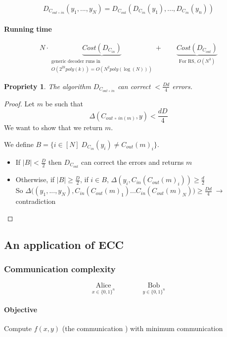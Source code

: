 \documentclass{article}
\newtheorem{prop}{Propriety}
\begin{document}
\[D_{C_{out\,\circ\, in}}(y_1,...,y_N)=D_{C_{out}}(D_{C_{in}}(y_1),...,D_{C_{in}}(y_n))\]


\paragraph{Running time}
\[N\cdot \underbrace{Cost(D_{C_{in}})}_{\substack{\text{generic decoder runs in}\\ O(2^{2k}poly(k))=O(N^2poly(\log(N)))}} + \qquad \underbrace{Cost(D_{C_{out}})}_{\text{For RS, } O(N^3)} \]

\begin{prop}
The algorithm $D_{C_{out \,\circ\, in}}$ can correct $<\frac{Dd}{4}$ errors.
\end{prop}
\begin{proof}
Let $m$ be such that 
\[\Delta( C_{out \,\circ \, in (m)},y) < \frac{dD}{4}\]
We want to show that we return $m$.

We define $B=\{i\in [N] \; D_{C_{in}}(y_i) \neq C_{out}(m)_i\}$.

\begin{itemize}
\item If $|B|<\frac{D}{2}$ then $D_{C_{out}}$ can correct the errors and returns $m$
\item Otherwise, if $|B|\geq \frac{D}{2}$, if $i\in B$, $\Delta(y_i,C_{in}(C_{out}(m)_i))\geq \frac{d}{2}$\\
So $\Delta \Big( (y_1,...,y_N),C_{in}(C_{out}(m)_1)...C_{in}(C_{out}(m)_N) \Big) \geq \frac{Dd}{4} \; \to \; $ contradiction
\end{itemize}
\end{proof}


\subsection{An application of ECC}

\subsubsection*{Communication complexity}
\[\underset{x\in \{0,1\}^n}{\text{Alice}} \qquad \qquad \underset{y\in \{0,1\}^n}{\text{Bob}} \]


\paragraph{Objective} Compute $f(x,y)$ (the communication ) with minimum communication
\end{document}
